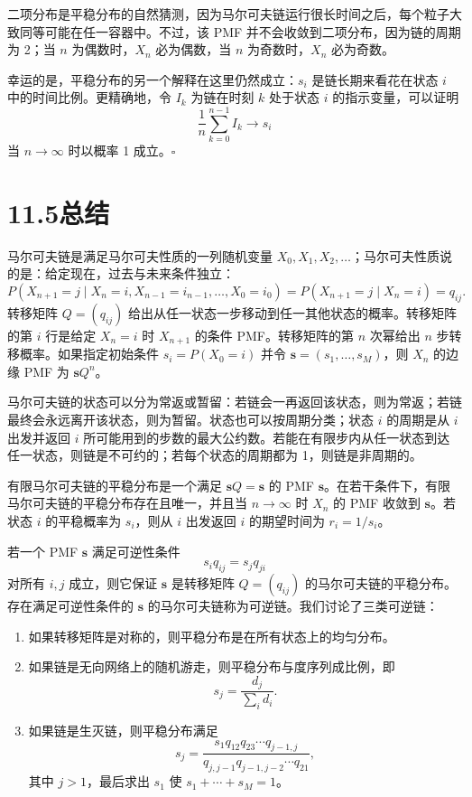 \documentclass[UTF8, 12pt, fontset=fandol, oneside]{ctexart}
\begin{document}
二项分布是平稳分布的自然猜测，因为马尔可夫链运行很长时间之后，每个粒子大致同等可能在任一容器中。不过，该 PMF 并不会收敛到二项分布，因为链的周期为 2；当 $n$ 为偶数时，$X_n$ 必为偶数，当 $n$ 为奇数时，$X_n$ 必为奇数。

幸运的是，平稳分布的另一个解释在这里仍然成立：$s_i$ 是链长期来看花在状态 $i$ 中的时间比例。更精确地，令 $I_k$ 为链在时刻 $k$ 处于状态 $i$ 的指示变量，可以证明
\[
  \frac1n\sum_{k=0}^{n-1}I_k\to s_i
\]
当 $n\to\infty$ 时以概率 1 成立。$\square$

\section*{11.5\quad 总结}

马尔可夫链是满足马尔可夫性质的一列随机变量 $X_0,X_1,X_2,\ldots$；马尔可夫性质说的是：给定现在，过去与未来条件独立：
\[
  P(X_{n+1}=j\mid X_n=i,X_{n-1}=i_{n-1},\ldots,X_0=i_0)
  =
  P(X_{n+1}=j\mid X_n=i)
  =
  q_{ij}.
\]
转移矩阵 $Q=(q_{ij})$ 给出从任一状态一步移动到任一其他状态的概率。转移矩阵的第 $i$ 行是给定 $X_n=i$ 时 $X_{n+1}$ 的条件 PMF。转移矩阵的第 $n$ 次幂给出 $n$ 步转移概率。如果指定初始条件 $s_i=P(X_0=i)$ 并令 $\mathbf s=(s_1,\ldots,s_M)$，则 $X_n$ 的边缘 PMF 为 $\mathbf sQ^n$。

马尔可夫链的状态可以分为常返或暂留：若链会一再返回该状态，则为常返；若链最终会永远离开该状态，则为暂留。状态也可以按周期分类；状态 $i$ 的周期是从 $i$ 出发并返回 $i$ 所可能用到的步数的最大公约数。若能在有限步内从任一状态到达任一状态，则链是不可约的；若每个状态的周期都为 1，则链是非周期的。

有限马尔可夫链的平稳分布是一个满足 $\mathbf sQ=\mathbf s$ 的 PMF $\mathbf s$。在若干条件下，有限马尔可夫链的平稳分布存在且唯一，并且当 $n\to\infty$ 时 $X_n$ 的 PMF 收敛到 $\mathbf s$。若状态 $i$ 的平稳概率为 $s_i$，则从 $i$ 出发返回 $i$ 的期望时间为 $r_i=1/s_i$。

若一个 PMF $\mathbf s$ 满足可逆性条件
\[
  s_iq_{ij}=s_jq_{ji}
\]
对所有 $i,j$ 成立，则它保证 $\mathbf s$ 是转移矩阵 $Q=(q_{ij})$ 的马尔可夫链的平稳分布。存在满足可逆性条件的 $\mathbf s$ 的马尔可夫链称为可逆链。我们讨论了三类可逆链：

\begin{enumerate}
\item 如果转移矩阵是对称的，则平稳分布是在所有状态上的均匀分布。
\item 如果链是无向网络上的随机游走，则平稳分布与度序列成比例，即
\[
  s_j=\frac{d_j}{\sum_i d_i}.
\]
\item 如果链是生灭链，则平稳分布满足
\[
  s_j=\frac{s_1q_{12}q_{23}\cdots q_{j-1,j}}
  {q_{j,j-1}q_{j-1,j-2}\cdots q_{21}},
\]
其中 $j>1$，最后求出 $s_1$ 使 $s_1+\cdots+s_M=1$。
\end{enumerate}
\end{document}
